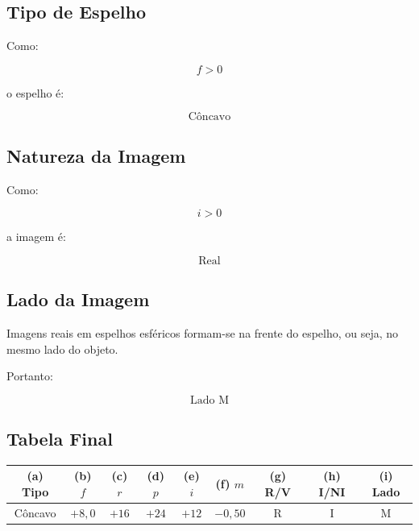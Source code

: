 \documentclass[12pt,a4paper]{article}
\begin{document}
\subsection*{Tipo de Espelho}

Como:

\[
f > 0
\]

o espelho é:

\[
\boxed{\text{Côncavo}}
\]


\subsection*{Natureza da Imagem}

Como:

\[
i > 0
\]

a imagem é:

\[
\boxed{\text{Real}}
\]


\subsection*{Lado da Imagem}

Imagens reais em espelhos esféricos formam-se na frente do espelho, ou seja, no mesmo lado do objeto.

Portanto:

\[
\boxed{\text{Lado M}}
\]


\subsection*{Tabela Final}

\begin{center}
\begin{tabular}{ccccccccc}
\hline

(a) Tipo & (b) $f$ & (c) $r$ & (d) $p$ & (e) $i$
& (f) $m$ & (g) R/V & (h) I/NI & (i) Lado \\

\hline

Côncavo & $+8,0$ & $+16$ & $+24$ & $+12$
& $-0,50$ & R & I & M \\

\hline
\end{tabular}
\end{center}
\end{document}
